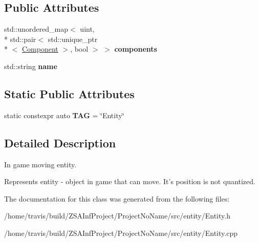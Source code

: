 \subsection*{Public Attributes}
\begin{DoxyCompactItemize}
\item 
\hypertarget{classEntity_ac57bd5720c2527ac204a327b1f9f9104}{std\-::unordered\-\_\-map$<$ uint, \\*
std\-::pair$<$ std\-::unique\-\_\-ptr\\*
$<$ \hyperlink{classComponent}{Component} $>$, bool $>$ $>$ {\bfseries components}}\label{classEntity_ac57bd5720c2527ac204a327b1f9f9104}

\item 
\hypertarget{classEntity_a931b21fbdebb1a5963b4bcab5df128f5}{std\-::string {\bfseries name}}\label{classEntity_a931b21fbdebb1a5963b4bcab5df128f5}

\end{DoxyCompactItemize}
\subsection*{Static Public Attributes}
\begin{DoxyCompactItemize}
\item 
\hypertarget{classEntity_a71274935a057ccb8119a625d1bff7ac4}{static constexpr auto {\bfseries T\-A\-G} = \char`\"{}Entity\char`\"{}}\label{classEntity_a71274935a057ccb8119a625d1bff7ac4}

\end{DoxyCompactItemize}


\subsection{Detailed Description}
In game moving entity. 

Represents entity -\/ object in game that can move. It's position is not quantized. 

The documentation for this class was generated from the following files\-:\begin{DoxyCompactItemize}
\item 
/home/travis/build/\-Z\-S\-A\-Inf\-Project/\-Project\-No\-Name/src/entity/Entity.\-h\item 
/home/travis/build/\-Z\-S\-A\-Inf\-Project/\-Project\-No\-Name/src/entity/Entity.\-cpp\end{DoxyCompactItemize}

